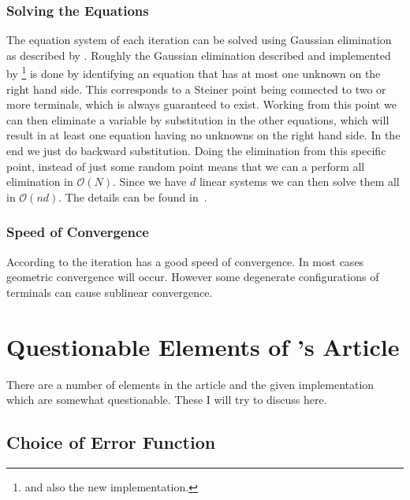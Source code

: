 \subsubsection{Solving the Equations}
\label{sec:solving-equations}

The equation system of each iteration can be solved using Gaussian elimination
as described by \textcite[p.~148--149]{smith1992}. Roughly the Gaussian
elimination described and implemented by \citeauthor{smith1992}\footnote{and
  also the new implementation.} is done by identifying an equation that has at
most one unknown on the right hand side. This corresponds to a Steiner point
being connected to two or more terminals, which is always guaranteed to exist.
Working from this point we can then eliminate a variable by substitution in the
other equations, which will result in at least one equation having no unknowns
on the right hand side. In the end we just do backward substitution. Doing the
elimination from this specific point, instead of just some random point means
that we can a perform all elimination in $\mathcal O(N)$. Since we have $d$
linear systems we can then solve them all in $\mathcal{O}(n d)$. The details can
be found in~\cite[p.~148--149]{smith1992}.

\subsubsection{Speed of Convergence}
\label{sec:speed-convergence}

According to \textcite[p.~150]{smith1992} the iteration has a good speed of
convergence. In most cases geometric convergence will occur. However some
degenerate configurations of terminals can cause sublinear convergence.

\section{Questionable Elements of \citeauthor{smith1992}'s Article}
\label{sec:quest-elem-smiths}

There are a number of elements in the article and the given
implementation~\cite{smith1992} which are somewhat questionable. These I will
try to discuss here.

\subsection{Choice of Error Function}
\label{sec:choice-error-funct}

